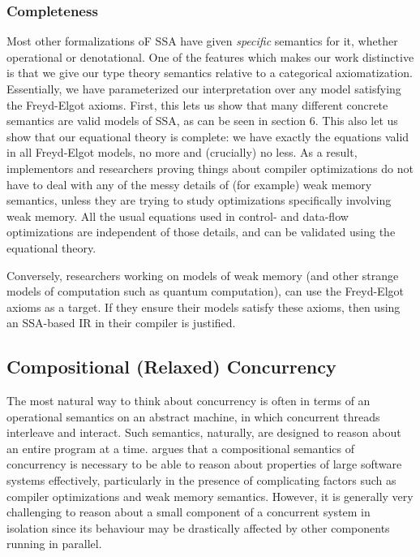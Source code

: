 \documentclass[acmsmall,screen,review]{acmart}
\begin{document}
\subsubsection{Completeness}

Most other formalizations oF SSA have given \emph{specific} semantics for it, whether operational or
denotational. One of the features which makes our work distinctive is that we give our type theory
semantics relative to a categorical axiomatization. Essentially, we have parameterized our
interpretation over any model satisfying the Freyd-Elgot axioms. First, this lets us show that many
different concrete semantics are valid models of SSA, as can be seen in section 6. This also let us
show that our equational theory is complete: we have exactly the equations valid in all Freyd-Elgot
models, no more and (crucially) no less. As a result, implementors and researchers proving things
about compiler optimizations do not have to deal with any of the messy details of (for example) weak
memory semantics, unless they are trying to study optimizations specifically involving weak memory.
All the usual  equations used in control- and data-flow optimizations are independent of those
details, and can be validated using the equational theory.

Conversely, researchers working on models of weak memory (and other strange models of computation
such as quantum computation), can use the Freyd-Elgot axioms as a target. If they ensure their
models satisfy these axioms, then using an SSA-based IR in their compiler is justified. 

\subsection{Compositional (Relaxed) Concurrency}

The most natural way to think about concurrency is often in terms of an operational semantics on an
abstract machine, in which concurrent threads interleave and interact. Such semantics, naturally,
are designed to reason about an entire program at a time. \citet{batty-compositional-17} argues that
a compositional semantics of concurrency is necessary to be able to reason about properties of large
software systems effectively, particularly in the presence of complicating factors such as compiler
optimizations and weak memory semantics. However, it is generally very challenging to reason about a
small component of a concurrent system in isolation since its behaviour may be drastically affected
by other components running in parallel.
\end{document}
